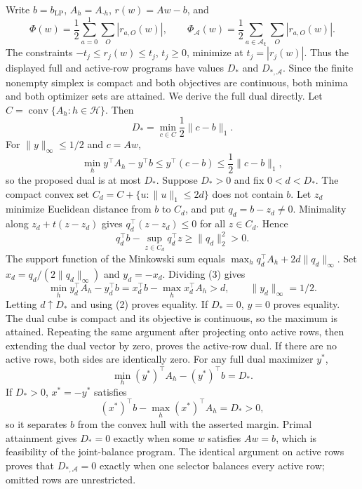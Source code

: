 Write \(b=b_{\mathrm{LP}}\), \(A_h=A_{\cdot h}\), \(r(w)=Aw-b\), and \[\Phi(w)=\frac12\sum_{a=0}^1\sum_O|r_{a,O}(w)|,\qquad \Phi_{\mathcal A}(w)=\frac12\sum_{a\in\mathcal A_{\boldsymbol\varepsilon}}\sum_O|r_{a,O}(w)|.\] The constraints \(-t_j\le r_j(w)\le t_j\), \(t_j\ge0\), minimize at \(t_j=|r_j(w)|\). Thus the displayed full and active-row programs have values \(D_*\) and \(D_{*,\mathcal A}\). Since the finite nonempty simplex is compact and both objectives are continuous, both minima and both optimizer sets are attained.
We derive the full dual directly. Let \(C=\operatorname{conv}\{A_h:h\in\mathcal H\}\). Then \[D_*=\min_{c\in C}\frac12\|c-b\|_1.\tag{1}\] For \(\|y\|_\infty\le1/2\) and \(c=Aw\), \[\min_hy^\top A_h-y^\top b\le y^\top(c-b)\le\frac12\|c-b\|_1,\tag{2}\] so the proposed dual is at most \(D_*\). Suppose \(D_*>0\) and fix \(0<d<D_*\). The compact convex set \(C_d=C+\{u:\|u\|_1\le2d\}\) does not contain \(b\). Let \(z_d\) minimize Euclidean distance from \(b\) to \(C_d\), and put \(q_d=b-z_d\ne0\). Minimality along \(z_d+t(z-z_d)\) gives \(q_d^\top(z-z_d)\le0\) for all \(z\in C_d\). Hence \[q_d^\top b-\sup_{z\in C_d}q_d^\top z\ge\|q_d\|_2^2>0.\tag{3}\] The support function of the Minkowski sum equals \(\max_hq_d^\top A_h+2d\|q_d\|_\infty\). Set \(x_d=q_d/(2\|q_d\|_\infty)\) and \(y_d=-x_d\). Dividing (3) gives \[\min_hy_d^\top A_h-y_d^\top b=x_d^\top b-\max_hx_d^\top A_h>d,\qquad\|y_d\|_\infty=1/2.\] Letting \(d\uparrow D_*\) and using (2) proves equality. If \(D_*=0\), \(y=0\) proves equality. The dual cube is compact and its objective is continuous, so the maximum is attained. Repeating the same argument after projecting onto active rows, then extending the dual vector by zero, proves the active-row dual. If there are no active rows, both sides are identically zero.
For any full dual maximizer \(y^*\), \[\min_h(y^*)^\top A_h-(y^*)^\top b=D_*.\] If \(D_*>0\), \(x^*=-y^*\) satisfies \[(x^*)^\top b-\max_h(x^*)^\top A_h=D_*>0,\] so it separates \(b\) from the convex hull with the asserted margin. Primal attainment gives \(D_*=0\) exactly when some \(w\) satisfies \(Aw=b\), which is feasibility of the joint-balance program. The identical argument on active rows proves that \(D_{*,\mathcal A}=0\) exactly when one selector balances every active row; omitted rows are unrestricted.
